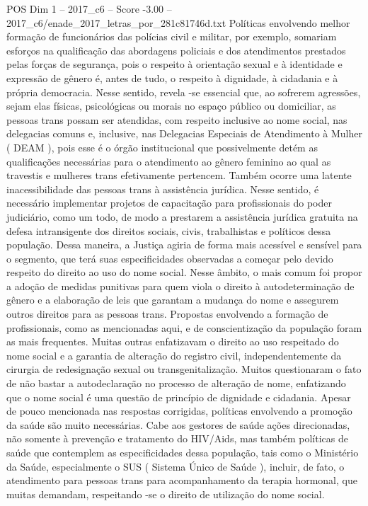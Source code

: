 \begin{textsample}{POS Dim 1 – 2017\_c6 – Score -3.00 – 2017\_c6/enade\_2017\_letras\_por\_281c81746d.txt}
Políticas envolvendo melhor formação de funcionários das polícias civil e militar, por exemplo, somariam esforços na qualificação das abordagens policiais e dos atendimentos prestados pelas forças de segurança, pois o respeito à orientação sexual e à identidade e expressão de gênero é, antes de tudo, o respeito à dignidade, à cidadania e à própria democracia.
Nesse sentido, revela -se essencial que, ao sofrerem agressões, sejam elas físicas, psicológicas ou morais no espaço público ou domiciliar, as pessoas trans possam ser atendidas, com respeito inclusive ao nome social, nas delegacias comuns e, inclusive, nas Delegacias Especiais de Atendimento à Mulher ( DEAM ), pois esse é o órgão institucional que possivelmente detém as qualificações necessárias para o atendimento ao gênero feminino ao qual as travestis e mulheres trans efetivamente pertencem.
Também ocorre uma latente inacessibilidade das pessoas trans à assistência jurídica.
Nesse sentido, é necessário implementar projetos de capacitação para profissionais do poder judiciário, como um todo, de modo a prestarem a assistência jurídica gratuita na defesa intransigente dos direitos sociais, civis, trabalhistas e políticos dessa população.
Dessa maneira, a Justiça agiria de forma mais acessível e sensível para o segmento, que terá suas especificidades observadas a começar pelo devido respeito do direito ao uso do nome social.
Nesse âmbito, o mais comum foi propor a adoção de medidas punitivas para quem viola o direito à autodeterminação de gênero e a elaboração de leis que garantam a mudança do nome e assegurem outros direitos para as pessoas trans.
Propostas envolvendo a formação de profissionais, como as mencionadas aqui, e de conscientização da população foram as mais frequentes.
Muitas outras enfatizavam o direito ao uso respeitado do nome social e a garantia de alteração do registro civil, independentemente da cirurgia de redesignação sexual ou transgenitalização.
Muitos questionaram o fato de não bastar a autodeclaração no processo de alteração de nome, enfatizando que o nome social é uma questão de princípio de dignidade e cidadania.
Apesar de pouco mencionada nas respostas corrigidas, políticas envolvendo a promoção da saúde são muito necessárias.
Cabe aos gestores de saúde ações direcionadas, não somente à prevenção e tratamento do HIV/Aids, mas também políticas de saúde que contemplem as especificidades dessa população, tais como o Ministério da Saúde, especialmente o SUS ( Sistema Único de Saúde ), incluir, de fato, o atendimento para pessoas trans para acompanhamento da terapia hormonal, que muitas demandam, respeitando -se o direito de utilização do nome social.

\end{textsample}

